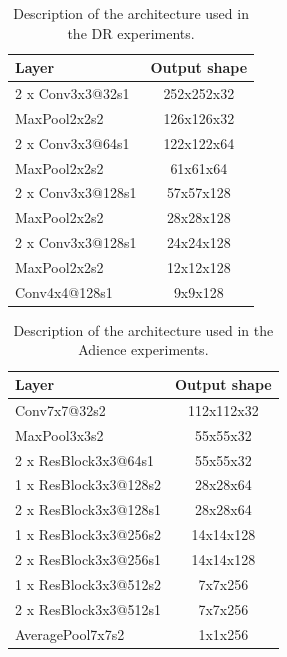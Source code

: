 \documentclass[journal]{IEEEtran}
\begin{document}
	\begin{table}[!t]
		\caption{Description of the architecture used in the DR experiments.}
		\label{table:CNNArchitecture}
		\centering
		\begin{tabular}{lc}
			\hline
			\hline
			\textbf{Layer} & \textbf{Output shape}\\
			\hline
			2 x Conv3x3@32s1 & 252x252x32\\
			MaxPool2x2s2 & 126x126x32\\
			
			2 x Conv3x3@64s1 & 122x122x64\\
			MaxPool2x2s2 & 61x61x64\\
			
			2 x Conv3x3@128s1 & 57x57x128\\
			MaxPool2x2s2 & 28x28x128\\
			
			2 x Conv3x3@128s1 & 24x24x128\\
			MaxPool2x2s2 & 12x12x128\\
			
			Conv4x4@128s1 & 9x9x128\\
			\hline
			\hline
		\end{tabular}	
	\end{table}
	
	\begin{table}[!t]
		\caption{Description of the architecture used in the Adience experiments.}
		\label{table:ResNetArchitecture}
		\centering
		\begin{tabular}{lc}
			\hline
			\hline
			\textbf{Layer} & \textbf{Output shape}\\
			\hline
			Conv7x7@32s2 & 112x112x32\\
			MaxPool3x3s2 & 55x55x32\\
			2 x ResBlock3x3@64s1 & 55x55x32\\
			1 x ResBlock3x3@128s2 & 28x28x64\\
			2 x ResBlock3x3@128s1 & 28x28x64\\
			1 x ResBlock3x3@256s2 & 14x14x128\\
			2 x ResBlock3x3@256s1 & 14x14x128\\
			1 x ResBlock3x3@512s2 & 7x7x256\\
			2 x ResBlock3x3@512s1 & 7x7x256\\
			AveragePool7x7s2 & 1x1x256\\
			\hline
			\hline
		\end{tabular}	
	\end{table}
	
\end{document}
